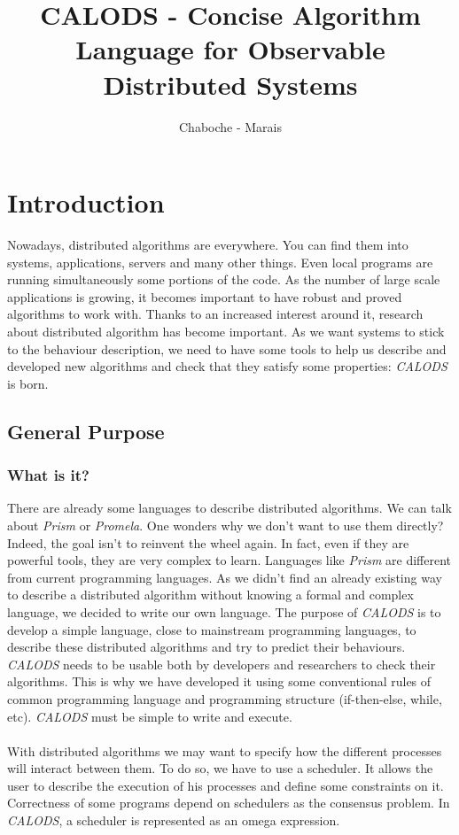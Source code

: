\documentclass{article}
\author{Chaboche - Marais}
\title{CALODS - Concise Algorithm Language for Observable Distributed Systems}
\begin{document}
\sffamily
\begin{titlingpage}
\maketitle
\end{titlingpage}

\newpage

\tableofcontents

\newpage


\section{Introduction}
Nowadays, distributed algorithms are everywhere. You can find them into systems, applications, servers and many other things. Even local programs are running simultaneously some portions of the code. As the number of large scale applications is growing, it becomes important to have robust and proved algorithms to work with. Thanks to an increased interest around it, research about distributed algorithm has become important. As we want systems to stick to the behaviour description, we need to have some tools to help us describe and developed new algorithms and check that they satisfy some properties: \textit{CALODS} is born.
  
\subsection{General Purpose}
\subsubsection{What is it?}
There are already some languages to describe distributed algorithms. We can talk about \textit{Prism} or \textit{Promela}. One wonders why we don't want to use them directly? Indeed, the goal isn't to reinvent the wheel again. In fact, even if they are powerful tools, they are very complex to learn. Languages like \textit{Prism} are different from current programming languages. As we didn't find an already existing way to describe a distributed algorithm without knowing a formal and complex language, we decided to write our own language. The purpose of \textit{CALODS} is to develop a simple language, close to mainstream programming languages, to describe these distributed algorithms and try to predict their behaviours. \textit{CALODS} needs to be usable both by developers and researchers to check their algorithms. This is why we have developed it using some conventional rules of common programming language and programming structure (if-then-else, while, etc). \textit{CALODS} must be simple to write and execute.\\ \\
With distributed algorithms we may want to specify how the different processes will interact between them. To do so, we have to use a scheduler. It allows the user to describe the execution of his processes and define some constraints on it. Correctness of some programs depend on schedulers as the consensus problem. In \textit{CALODS}, a scheduler is represented as an omega expression.
\end{document}
